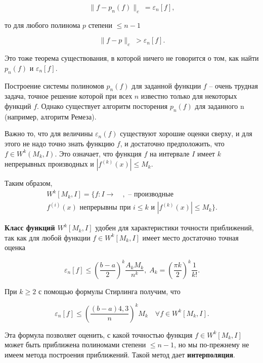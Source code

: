 \begin{equation}\label{eq:best_polynom}
\parallel f - p_n(f) \parallel_c \; = \varepsilon_n[f],
\end{equation}

то для любого полинома $p$ степени $\leq n - 1$

\begin{equation}
\parallel f - p \parallel_c \; > \varepsilon_n[f].
\end{equation}

Это тоже теорема существования, в которой ничего не говорится о том, как найти $p_n(f)$ и  $\varepsilon_n[f]$.

Построение системы полиномов $p_n(f)$ для заданной функции $f$ -- очень трудная задача, точное решение которой при всех $n$ известно только для некоторых функций $f$. 
Однако существует алгоритм посторения $p_n(f)$ для заданного n (например, алгоритм Ремеза).

Важно то, что для величины $\varepsilon_n(f)$ существуют хорошие оценки сверху, и для этого не надо точно знать функцию $f$, и достаточно предположить, что $f \in W^k(M_k, I)$. Это означает, что функция $f$ на интервале $I$ имеет $k$ непрерывных производных и $|f^{(k)}(x)|\leq M_k$. 

Таким образом,
\begin{align}
W^k[M_k, I] = \{f: I \rightarrow \quad, \text{ -- производные} \nonumber \\
f^{(i)}(x) \text{ непрерывны при $i \leq k$ и } |f^{(k)}(x)| \leq M_k \}.
\end{align}


\textbf{Класс функций $W^k[M_k, I]$} удобен для характеристики точности приближений, так как для любой функции $f \in W^k[M_k, I]$ имеет место достаточно точная оценка

\begin{equation}
\varepsilon_n[f] \leq \left(\frac{b-a}{2}\right)^k \frac{A_k M_k}{n^k},\; A_k = \left(\frac{\pi k}{2}\right) ^k \frac{1}{k!}.
\end{equation}

При $k \geq 2$ с помощью формулы Стирлинга получим, что 

\begin{equation}
\varepsilon_n[f] \leq \left(\frac{(b-a)4,3}{n}\right)^k M_k \quad \forall f \in W^k[M_k, I].
\end{equation}

Эта формула позволяет оценить, с какой точностью функция $f \in W^k[M_k, I]$ может быть приближена полиномами степени $\leq n-1$, но мы по-прежнему не имеем метода построения приближений.
Такой метод дает \textbf{интерполяция}.

